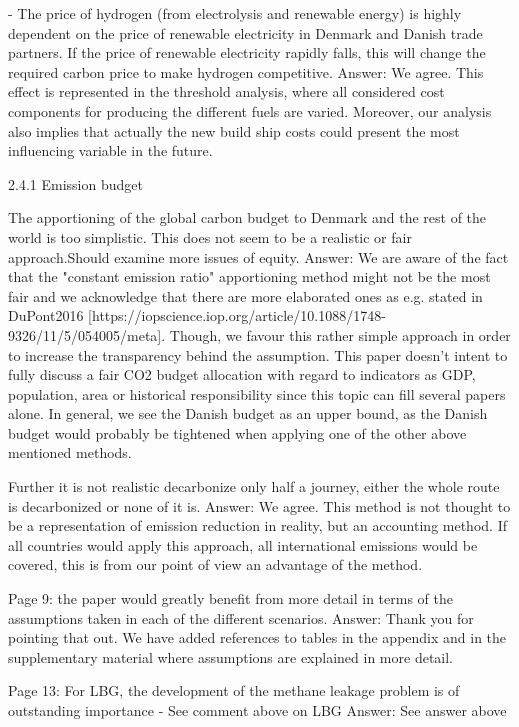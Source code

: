 -	The price of hydrogen (from electrolysis and renewable energy) is highly dependent on the price of renewable electricity in Denmark and Danish trade partners. If the price of renewable electricity rapidly falls, this will change the required carbon price to make hydrogen competitive.
Answer: We agree. This effect is represented in the threshold analysis, where all considered cost components for producing the different fuels are varied. Moreover, our analysis also implies that actually the new build ship costs could present the most influencing variable in the future.

2.4.1 Emission budget

The apportioning of the global carbon budget to Denmark and the rest of the world is too simplistic. This does not seem to be a realistic or fair approach.Should examine more issues of equity. 
Answer: We are aware of the fact that the "constant emission ratio" apportioning method might not be the most fair and we acknowledge that there are more elaborated ones as e.g. stated in DuPont2016 [https://iopscience.iop.org/article/10.1088/1748-9326/11/5/054005/meta]. Though, we favour this rather simple approach in order to increase the transparency behind the assumption. This paper doesn't intent to fully discuss a fair CO2 budget allocation with regard to indicators as GDP, population, area or historical responsibility since this topic can fill several papers alone. In general, we see the Danish budget as an upper bound, as the Danish budget would probably be tightened when applying one of the other above mentioned methods.

Further it is not realistic decarbonize only half a journey, either the whole route is decarbonized or none of it is.
Answer: We agree. This method is not thought to be a representation of emission reduction in reality, but an accounting method. If all countries would apply this approach, all international emissions would be covered, this is from our point of view an advantage of the method.

Page 9: the paper would greatly benefit from more detail in terms of the assumptions taken in each of the different scenarios.
Answer: Thank you for pointing that out. We have added references to tables in the appendix and in the supplementary material where assumptions are explained in more detail.

Page 13: For LBG, the development of the methane leakage problem is of outstanding importance
-	See comment above on LBG
Answer: See answer above

